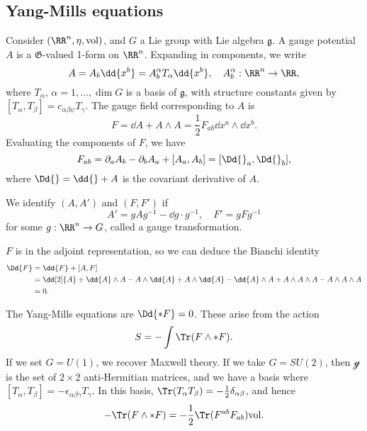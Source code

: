 \documentclass{jknotes}
\begin{document}
\subsection{Yang-Mills equations}
Consider \((\RR^n,\eta,\mathrm{vol})\), and \(G\) a Lie group with Lie algebra \(\mathfrak{g}\). A gauge potential \(A\) is a \(\mathfrak{G}\)-valued 1-form on \(\RR^n\). Expanding in components, we write
\begin{equation}
    A = A_b\dd{x^b} = A^\alpha_b T_\alpha \dd{x^b},\quad A^\alpha_b:\RR^n\to\RR,
\end{equation}
where \(T_\alpha\), \(\alpha=1,\dots,\dim G\) is a basis of \(\mathfrak{g}\), with structure constants given by \([T_\alpha,T_\beta] = c_{\alpha\beta\psi}T_\gamma\). The gauge field corresponding to \(A\) is
\begin{equation}
    F = \dd{A} + A\wedge A = \frac{1}{2} F_{ab} \dd{x^a}\wedge\dd{x^b}.
\end{equation}
Evaluating the components of \(F\), we have
\begin{equation}
    F_{ab} = \partial_a A_b - \partial_b A_a + [A_a,A_b] = [\Dd{}_a,\Dd{}_b],
\end{equation}
where \(\Dd{}=\dd{} + A\) is the covariant derivative of \(A\). 

We identify \((A,A')\) and \((F,F')\) if
\begin{equation}
    A' = gAg^{-1} - \dd{g}\cdot g^{-1},\quad F' = gFg^{-1}
\end{equation}
for some \(g:\RR^n\to G\), called a gauge transformation.

\(F\) is in the adjoint representation, so we can deduce the Bianchi identity
\begin{align}
    \Dd{F} &= \dd{F} + [A,F] \\
           &= \dd[2]{A} + \dd{A}\wedge A - A \wedge \dd{A} + A\wedge\dd{A} - \dd{A}\wedge A + A \wedge A \wedge A - A \wedge A \wedge A \\
           &= 0.
\end{align}

The Yang-Mills equations are \(\Dd{*F} = 0\). These arise from the action
\begin{equation}
    S = -\int \Tr(F\wedge *F).
\end{equation}
If we set \(G=U(1)\), we recover Maxwell theory. If we take \(G=SU(2)\), then \(\mathcal{g}\) is the set of \(2\times 2\) anti-Hermitian matrices, and we have a basis where \([T_\alpha,T_\beta] = -\epsilon_{\alpha\beta\gamma}T_\gamma\). In this basis, \(\Tr(T_\alpha T_\beta) = -\frac{1}{2}\delta_{\alpha\beta}\), and hence
\begin{equation}
    -\Tr(F\wedge *F) = -\frac{1}{2}\Tr(F^{ab}F_{ab})\mathrm{vol}.
\end{equation}
\end{document}
